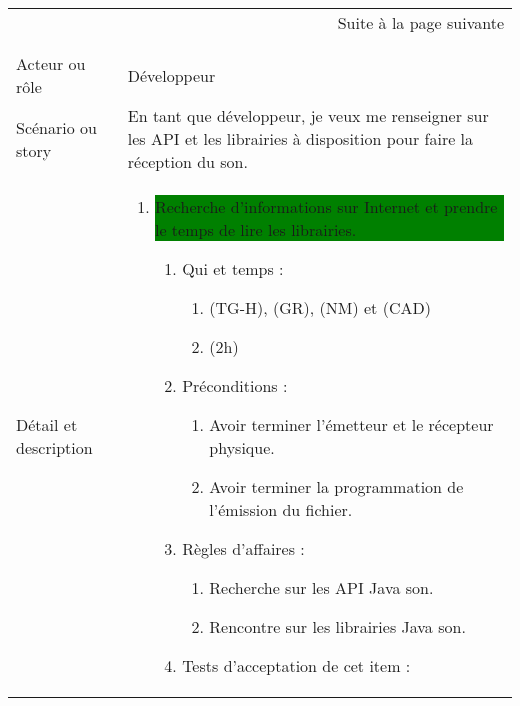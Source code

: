\begin{longtable}{|l|p{}|}
\multicolumn{2}{r}{Suite à la page suivante} \\
\endfoot

\multicolumn{2}{r}{} \\
\endlastfoot

\hline
    \rowcolor{Gray}
    \multicolumn{2}{|l|}{1} \\
\hline
    Acteur ou rôle & Développeur  \\
\hline
    Scénario ou story & En tant que développeur, je veux me renseigner sur les API et les librairies à disposition pour faire la réception du son. \\
\hline
    Détail et description &
        \begin{enumerate}[label*=\arabic*.]
       \item \colorbox{Green}{\parbox{13cm}{Recherche d'informations sur Internet et prendre le temps de lire les librairies.}}
            \begin{enumerate}[label*=\arabic*.]
                    \item Qui et temps :
                    \begin{enumerate}[label*=\arabic*.]
                        \item (TG-H), (GR), (NM) et (CAD)
                        \item (2h)
                    \end{enumerate}
                    \item Préconditions :
                    \begin{enumerate}[label*=\arabic*.]
                    \item Avoir terminer l'émetteur et le récepteur physique.
                     \item Avoir terminer la programmation de l'émission du fichier.
                    \end{enumerate}
                    \item Règles d’affaires :
                    \begin{enumerate}[label*=\arabic*.]
                        \item Recherche sur les API Java son.
                        \item Rencontre sur les librairies Java son.
                    \end{enumerate}
                    \item Tests d'acceptation de cet item :
                    \begin{enumerate}[label*=\arabic*.]

\end{enumerate}
\end{enumerate}
\end{enumerate}
\end{longtable}

